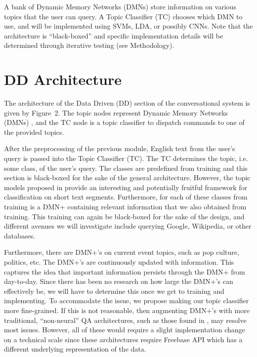 \documentclass[10pt,twoside,twocolumn]{article}
\begin{document}
\noindent
A bank of Dynamic Memory Networks (DMNs) \cite{Kumar:2015, Xiong2016} store information on various topics that the user can query. A Topic Classifier (TC) chooses which DMN to use, and will be implemented using SVMs\cite{Joachims1998, Pilaszy2005}, LDA\cite{Blei2001, Zhao2011}, or possibly CNNs\cite{Kim2014}. Note that the architecture is ``black-boxed'' and specific implementation details will be determined through iterative testing (see Methodology).

\section{DD Architecture}
The architecture of the Data Driven (DD) section of the conversational system is given by Figure~2. The topic nodes represent Dynamic Memory Networks (DMNs) \cite{Kumar:2015, Xiong2016}, and the TC node is a topic classifier to dispatch commands to one of the provided topics.

\noindent
After the preprocessing of the previous module, English text from the user's query is passed into the Topic Classifier (TC). The TC determines the topic, i.e. some class, of the user's query. The classes are predefined from training and this section is black-boxed for the sake of the general architecture. However, the topic models proposed in \cite{Zhao2011} provide an interesting and potentially fruitful framework for classification on short text segments. Furthermore, for each of these classes from training is a DMN+ \cite{Xiong2016} containing relevant information that we also obtained from training. This training can again be black-boxed for the sake of the design, and different avenues we will investigate include querying Google, Wikipedia, or other databases.

\noindent
Furthermore, there are DMN+'s on current event topics, such as pop culture, politics, etc. The DMN+'s are continuously updated with information. This captures the idea that important information persists through the DMN+ from day-to-day. Since there has been no research on how large the DMN+'s can effectively be, we will have to determine this once we get to training and implementing. To accommodate the issue, we propose making our topic classifier more fine-grained. If this is not reasonable, then augmenting DMN+'s with more traditional, ``non-neural'' QA architectures, such as those found in \cite{Iyyer2014, Yao2014a, Yao2014b}, may resolve most issues. However, all of these would require a slight implementation change on a technical scale since these architectures require Freebase API which has a different underlying representation of the data.
\end{document}
